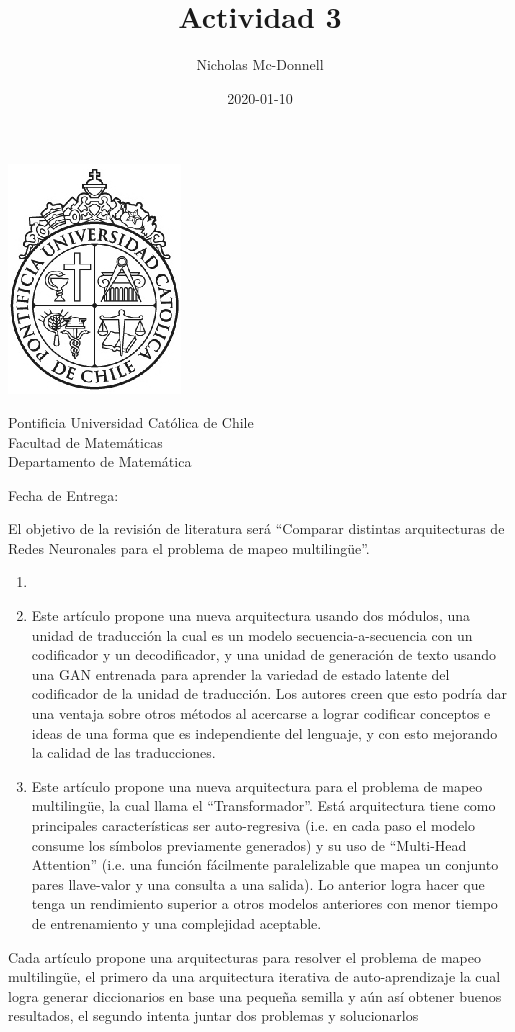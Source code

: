 \documentclass[12pt,letterpaper]{article}
\title{Actividad 3}
\date{2020-01-10}
\author{Nicholas Mc-Donnell}
\renewcommand{\maketitle}{
    \begin{titlepage}
        \begin{minipage}{2.5cm}
            \includegraphics[scale=0.25]{img/puc}
        \end{minipage}
        \begin{minipage}{13cm}
            \begin{flushleft}
                \raggedright
                {\noindent
                    {\sc Pontificia Universidad Católica de Chile\\
                        Facultad de Matemáticas\\
                        Departamento de Matemática}\smallskip \\
                }
            \end{flushleft}
        \end{minipage}
        \vspace{2ex}

        {\centering\noindent\Large{\bf \thetitle}\par}
        {\centering\noindent\large {\thecourse}\par}
        \centerline{Fecha de Entrega: \thedate}
        \vfill

        \begin{flushright}
            {\Large\theauthor}
        \end{flushright}

    \end{titlepage}
}
\begin{document}
\maketitle
\justify


El objetivo de la revisión de literatura será ``Comparar distintas arquitecturas de Redes Neuronales para el problema de mapeo multilingüe''.

\begin{enumerate}
    \item \cite{artetxe2018robust}
    \item \cite{rashid2019bilingualgan}
          Este artículo propone una nueva arquitectura usando dos módulos, una unidad de traducción la cual es un modelo secuencia-a-secuencia con un codificador y un decodificador, y una unidad de generación de texto usando una GAN entrenada para aprender la variedad de estado latente del codificador de la unidad de traducción. Los autores creen que esto podría dar una ventaja sobre otros métodos al acercarse a lograr codificar conceptos e ideas de una forma que es independiente del lenguaje, y con esto mejorando la calidad de las traducciones.
    \item \cite{vaswani2017attention}
          Este artículo propone una nueva arquitectura para el problema de mapeo multilingüe, la cual llama el ``Transformador''. Está arquitectura tiene como principales características ser auto-regresiva (i.e. en cada paso el modelo consume los símbolos previamente generados) y su uso de ``Multi-Head Attention'' (i.e. una función fácilmente paralelizable que mapea un conjunto pares llave-valor y una consulta a una salida). Lo anterior logra hacer que tenga un rendimiento superior a otros modelos anteriores con menor tiempo de entrenamiento y una complejidad aceptable.
\end{enumerate}

Cada artículo propone una arquitecturas para resolver el problema de mapeo multilingüe, el primero da una arquitectura iterativa de auto-aprendizaje la cual logra generar diccionarios en base una pequeña semilla y aún así obtener buenos resultados, el segundo intenta juntar dos problemas y solucionarlos



\end{document}
